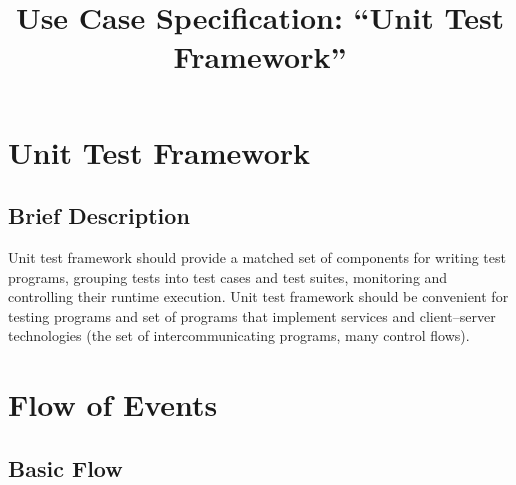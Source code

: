 \documentclass[a4paper,twoside]{article}
\title{Use Case Specification: ``Unit Test Framework''}
\begin{document}
\maketitle
\tableofcontents

\section{Unit Test Framework}



\subsection{Brief Description}


Unit test framework should provide a matched set of components for writing
test programs, grouping tests into test cases and test suites,
monitoring and controlling their runtime execution. Unit test framework
should be convenient for testing programs and set of programs that implement
services and client--server technologies (the set of intercommunicating programs, many
control flows).

\section{Flow of Events}

\subsection{Basic Flow}
\end{document}
